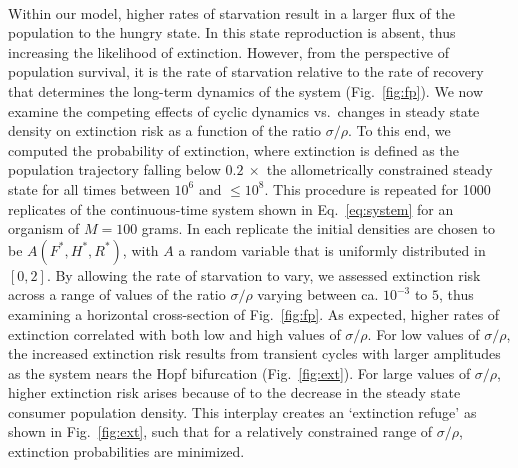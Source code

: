 \documentclass{pnastwo}
\begin{document}
\begin{article}
\\
Within our model, higher rates of starvation result in a larger flux of the
population to the hungry state.  In this state reproduction is absent, thus
increasing the likelihood of extinction.  However, from the perspective of
population survival, it is the rate of starvation relative to the rate of
recovery that determines the long-term dynamics of the system
(Fig.~\ref{fig:fp}).  We now examine the competing effects of cyclic dynamics
vs.\ changes in steady state density on extinction risk as a function of the
ratio $\sigma/\rho$.  To this end, we computed the probability of extinction,
where extinction is defined as the population trajectory falling below
$0.2~\times$ the allometrically constrained steady state for all times
between $10^6$ and $\leq 10^8$.  This procedure is repeated for 1000
replicates of the continuous-time system shown in Eq.~\ref{eq:system} for an
organism of $M=100$ grams.  
In each replicate the
initial densities are chosen to be $A(F^*,H^*,R^*)$, with $A$ a random
variable that is uniformly distributed in $[0,2]$.  By allowing the rate of
starvation to vary, we assessed extinction risk across a range of values of
the ratio $\sigma/\rho$ varying between ca. $10^{-3}$ to $5$, thus examining a
horizontal cross-section of Fig.~\ref{fig:fp}.  
As expected, higher rates of
extinction correlated with both low and high values of $\sigma/\rho$.  For
low values of $\sigma/\rho$, the increased extinction risk results from
transient cycles with larger amplitudes as the system nears the Hopf
bifurcation (Fig.~\ref{fig:ext}).  For large values of $\sigma/\rho$, higher
extinction risk arises because of to the decrease in the steady state
consumer population density.  This interplay creates an `extinction refuge'
as shown in Fig.~\ref{fig:ext}, such that for a relatively constrained range
of $\sigma/\rho$, extinction probabilities are minimized.


\end{article}
\end{document}
